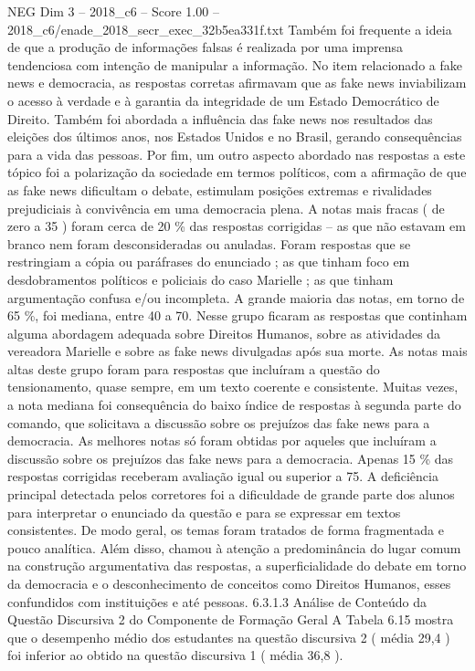\begin{textsample}{NEG Dim 3 – 2018\_c6 – Score 1.00 – 2018\_c6/enade\_2018\_secr\_exec\_32b5ea331f.txt}
Também foi frequente a ideia de que a produção de informações falsas é realizada por uma imprensa tendenciosa com intenção de manipular a informação.
No item relacionado a fake news e democracia, as respostas corretas afirmavam que as fake news inviabilizam o acesso à verdade e à garantia da integridade de um Estado Democrático de Direito.
Também foi abordada a influência das fake news nos resultados das eleições dos últimos anos, nos Estados Unidos e no Brasil, gerando consequências para a vida das pessoas.
Por fim, um outro aspecto abordado nas respostas a este tópico foi a polarização da sociedade em termos políticos, com a afirmação de que as fake news dificultam o debate, estimulam posições extremas e rivalidades prejudiciais à convivência em uma democracia plena.
A notas mais fracas ( de zero a 35 ) foram cerca de 20 \% das respostas corrigidas – as que não estavam em branco nem foram desconsideradas ou anuladas.
Foram respostas que se restringiam a cópia ou paráfrases do enunciado ; as que tinham foco em desdobramentos políticos e policiais do caso Marielle ; as que tinham argumentação confusa e/ou incompleta.
A grande maioria das notas, em torno de 65 \%, foi mediana, entre 40 a 70.
Nesse grupo ficaram as respostas que continham alguma abordagem adequada sobre Direitos Humanos, sobre as atividades da vereadora Marielle e sobre as fake news divulgadas após sua morte.
As notas mais altas deste grupo foram para respostas que incluíram a questão do tensionamento, quase sempre, em um texto coerente e consistente.
Muitas vezes, a nota mediana foi consequência do baixo índice de respostas à segunda parte do comando, que solicitava a discussão sobre os prejuízos das fake news para a democracia.
As melhores notas só foram obtidas por aqueles que incluíram a discussão sobre os prejuízos das fake news para a democracia.
Apenas 15 \% das respostas corrigidas receberam avaliação igual ou superior a 75.
A deficiência principal detectada pelos corretores foi a dificuldade de grande parte dos alunos para interpretar o enunciado da questão e para se expressar em textos consistentes.
De modo geral, os temas foram tratados de forma fragmentada e pouco analítica.
Além disso, chamou à atenção a predominância do lugar comum na construção argumentativa das respostas, a superficialidade do debate em torno da democracia e o desconhecimento de conceitos como Direitos Humanos, esses confundidos com instituições e até pessoas. 6.3.1.3 Análise de Conteúdo da Questão Discursiva 2 do Componente de Formação Geral A Tabela 6.15 mostra que o desempenho médio dos estudantes na questão discursiva 2 ( média 29,4 ) foi inferior ao obtido na questão discursiva 1 ( média 36,8 ).

\end{textsample}
